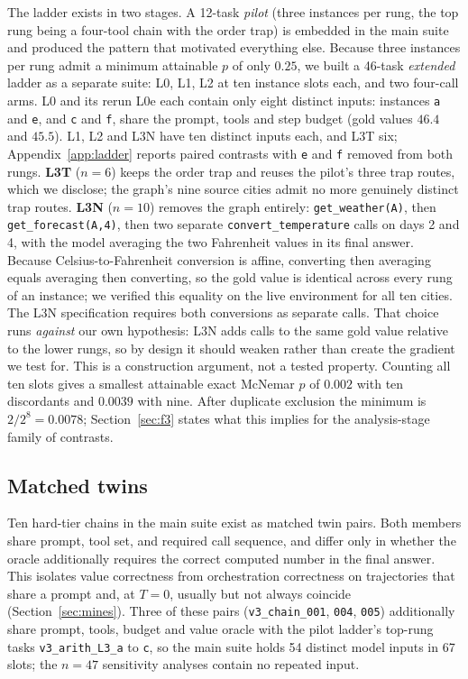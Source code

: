 \documentclass[11pt]{article}
\begin{document}
The ladder exists in two stages. A 12-task \emph{pilot} (three instances per rung, the top rung being a four-tool chain with the order trap) is embedded in the main suite and produced the pattern that motivated everything else. Because three instances per rung admit a minimum attainable $p$ of only $0.25$, we built a 46-task \emph{extended} ladder as a separate suite: L0, L1, L2 at ten instance slots each, and two four-call arms. L0 and its rerun L0e each contain only eight distinct inputs: instances \texttt{a} and \texttt{e}, and \texttt{c} and \texttt{f}, share the prompt, tools and step budget (gold values $46.4$ and $45.5$). L1, L2 and L3N have ten distinct inputs each, and L3T six; Appendix~\ref{app:ladder} reports paired contrasts with \texttt{e} and \texttt{f} removed from both rungs. \textbf{L3T} ($n=6$) keeps the order trap and reuses the pilot's three trap routes, which we disclose; the graph's nine source cities admit no more genuinely distinct trap routes. \textbf{L3N} ($n=10$) removes the graph entirely: \texttt{get\_weather(A)}, then \texttt{get\_forecast(A,4)}, then two separate \texttt{convert\_temperature} calls on days 2 and 4, with the model averaging the two Fahrenheit values in its final answer. Because Celsius-to-Fahrenheit conversion is affine, converting then averaging equals averaging then converting, so the gold value is identical across every rung of an instance; we verified this equality on the live environment for all ten cities. The L3N specification requires both conversions as separate calls. That choice runs \emph{against} our own hypothesis: L3N adds calls to the same gold value relative to the lower rungs, so by design it should weaken rather than create the gradient we test for. This is a construction argument, not a tested property. Counting all ten slots gives a smallest attainable exact McNemar $p$ of $0.002$ with ten discordants and $0.0039$ with nine. After duplicate exclusion the minimum is $2/2^8=0.0078$; Section~\ref{sec:f3} states what this implies for the analysis-stage family of contrasts.

\subsection{Matched twins}
\label{sec:twins}
Ten hard-tier chains in the main suite exist as matched twin pairs. Both members share prompt, tool set, and required call sequence, and differ only in whether the oracle additionally requires the correct computed number in the final answer. This isolates value correctness from orchestration correctness on trajectories that share a prompt and, at $T=0$, usually but not always coincide (Section~\ref{sec:mines}). Three of these pairs (\texttt{v3\_chain\_001}, \texttt{004}, \texttt{005}) additionally share prompt, tools, budget and value oracle with the pilot ladder's top-rung tasks \texttt{v3\_arith\_L3\_a} to \texttt{c}, so the main suite holds 54 distinct model inputs in 67 slots; the $n=47$ sensitivity analyses contain no repeated input.
\end{document}
